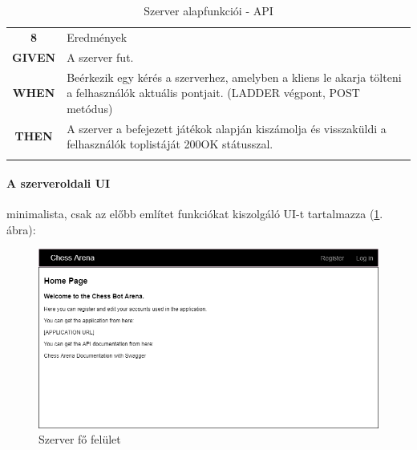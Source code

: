 \documentclass[twoside, a4paper, 12pt]{article}
\begin{document}
\begin{longtable}[c]{|c|p{14cm}|}
	\rowcolor[HTML]{CBCEFB} 
	\textbf{8}
	&	Eredmények
	\\ \nobreakhline
	
	\textbf{GIVEN} &
	A szerver fut.
	\\ \nobreakhline
	
	\textbf{WHEN} &
	Beérkezik egy kérés a szerverhez, amelyben a kliens le akarja tölteni a felhasználók aktuális pontjait. (LADDER végpont, POST metódus)
	\\
	\nobreakhline
	
	\textbf{THEN} &
	A szerver a befejezett játékok alapján kiszámolja és visszaküldi a felhasználók toplistáját 200OK státusszal.
	\\
	\hline
	
	\caption{Szerver alapfunkciói - API}
	\label{userStories:server:api}\\
\end{longtable} 













\paragraph{A szerveroldali UI} minimalista, csak az előbb említet funkciókat kiszolgáló UI-t tartalmazza (\ref{fig:serverUiMainScreen}. ábra):

\begin{figure}[htbp]
	\centering
	\includegraphics[width=1.0\textwidth]{img/serverUiMainScreen.png}
	\caption{Szerver fő felület}
	\label{fig:serverUiMainScreen}
\end{figure}
\end{document}
